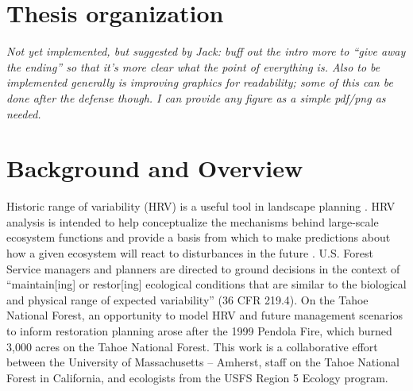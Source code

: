 \section{Thesis organization}



\emph{Not yet implemented, but suggested by Jack: buff out the intro more to ``give away the ending'' so that it's more clear what the point of everything is. Also to be implemented generally is improving graphics for readability; some of this can be done after the defense though. I can provide any figure as a simple pdf/png as needed.}
\section{Background and Overview}

Historic range of variability (HRV) is a useful tool in landscape planning \citep{Nonaka2005}. HRV analysis is intended to help conceptualize the mechanisms behind large-scale ecosystem functions and provide a basis from which to make predictions about how a given ecosystem will react to disturbances in the future \citep{Nonaka2005,Landres1999}. U.S. Forest Service managers and planners are directed to ground decisions in the context of ``maintain[ing] or restor[ing] ecological conditions that are similar to the biological and physical range of expected variability'' (36 CFR 219.4). On the Tahoe National Forest, an opportunity to model HRV and future management scenarios to inform restoration planning arose after the 1999 Pendola Fire, which burned 3,000 acres on the Tahoe National Forest. This work is a collaborative effort between the University of Massachusetts -- Amherst, staff on the Tahoe National Forest in California, and ecologists from the USFS Region 5 Ecology program.

